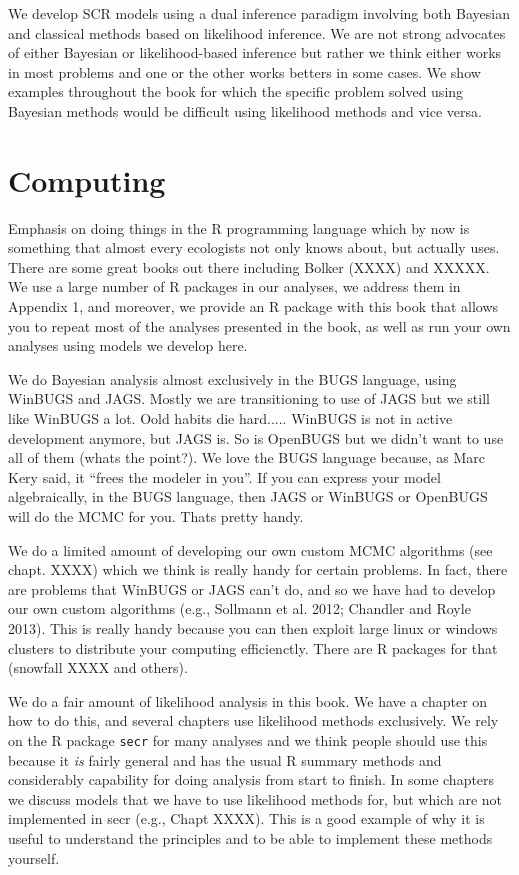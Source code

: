 We develop SCR models using a dual inference paradigm involving both
Bayesian and classical methods based on likelihood inference.
We are not strong advocates of either Bayesian or likelihood-based
inference but rather we think either works in most problems and one or
the other works betters in some cases. 
We show examples throughout the
book for which the specific problem solved using Bayesian methods
would be difficult using likelihood methods and vice versa.


\section*{Computing}

Emphasis on doing things in the 
R programming language which by now is something that almost every
ecologists not only knows about, but actually uses.  There are some
great books out there including Bolker (XXXX) and XXXXX. We use a
large number of R packages in our analyses, we address them in
Appendix 1, and moreover, we provide an R package with this book that allows you to repeat most of the analyses presented in the book, as well as run your own analyses using models we develop here.

We do Bayesian analysis almost exclusively in the BUGS language, using
WinBUGS and JAGS. Mostly we are transitioning to use of JAGS but we
still like WinBUGS a lot. Oold habits die hard..... WinBUGS is not in
active development anymore, but JAGS is. So is OpenBUGS but we didn't
want to use all of them (whats the point?). We love the BUGS language
because, as Marc Kery said, it ``frees the modeler in you''.
If you can express your model algebraically, in the BUGS language,
then JAGS or WinBUGS or OpenBUGS will do the MCMC for you. Thats
pretty handy.

We do a limited amount of developing our own custom MCMC algorithms
(see chapt. XXXX) which we think is really handy for certain
problems. In fact, there are problems that WinBUGS or JAGS can't do,
and so we have had to develop our own custom algorithms (e.g.,
Sollmann et al. 2012; Chandler and Royle 2013). This is really handy
because you can then exploit large linux or windows clusters to
distribute your computing efficienctly. There are R packages for that
(snowfall XXXX and others). 

We do a fair amount of likelihood analysis in this book. We have a
chapter on how to do this, and several chapters use likelihood methods
exclusively. We rely 
on the R package \mbox{\tt secr} \citep{efford_etal:2009euring} for
many analyses and we think people should use this because it {\it is}
fairly general and has the usual R summary methods and considerably
capability for doing analysis from start to finish. In some chapters
we discuss models that we have to use likelihood methods for, but
which are not implemented in secr  (e.g., Chapt XXXX). This is a good
example of why it
is useful to understand the principles and to be able to implement
these methods yourself. 


